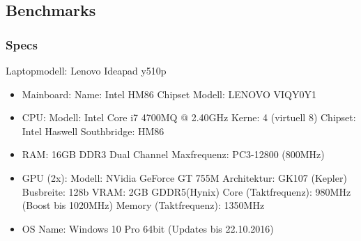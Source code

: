 \subsection{Benchmarks}
\subsubsection{Specs}
Laptopmodell: Lenovo Ideapad y510p\\
\begin{itemize}
	\item Mainboard:
	\subitem Name: Intel HM86 Chipset
	\subitem Modell: LENOVO VIQY0Y1
	\item CPU:
	\subitem Modell: Intel Core i7 4700MQ @ 2.40GHz
	\subitem Kerne: 4 (virtuell 8)
	\subitem Chipset: Intel Haswell
	\subitem Southbridge: HM86
	\subitem 
	\item RAM:
	\subitem 16GB DDR3
	\subitem Dual Channel
	\subitem Maxfrequenz: PC3-12800 (800MHz)
	\item GPU (2x):
	\subitem Modell: NVidia GeForce GT 755M
	\subitem Architektur: GK107 (Kepler)
	\subitem Busbreite: 128b
	\subitem VRAM: 2GB GDDR5(Hynix)
	\subitem Core (Taktfrequenz): 980MHz (Boost bis 1020MHz)
	\subitem Memory (Taktfrequenz): 1350MHz
	\item OS
	\subitem Name: Windows 10 Pro 64bit (Updates bis 22.10.2016)	
\end{itemize}
